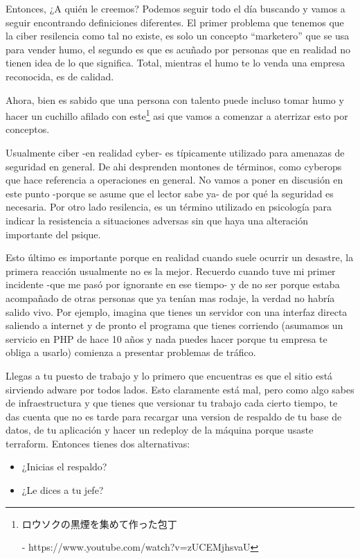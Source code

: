 \documentclass[11pt]{utalcaDoc}
\begin{document}
Entonces, ¿A quién le creemos? Podemos seguir todo el día buscando y vamos a seguir encontrando definiciones diferentes. El primer problema que tenemos que la ciber resilencia como tal no existe, es solo un concepto ``marketero'' que se usa para vender humo, el segundo es que es acuñado por personas que en realidad no tienen idea de lo que significa. Total, mientras el humo te lo venda una empresa reconocida, es de calidad.

Ahora, bien es sabido que una persona con talento puede incluso tomar humo y hacer un cuchillo afilado con este\footnote{\begin{CJK}{UTF8}{min}ロウソクの黒煙を集めて作った包丁 \end{CJK}- https://www.youtube.com/watch?v=zUCEMjhsvaU} asi que vamos a comenzar a aterrizar esto por conceptos.

Usualmente ciber -en realidad cyber- es típicamente utilizado para amenazas de seguridad en general. De ahi desprenden montones de términos, como cyberops que hace referencia a operaciones en general. No vamos a poner en discusión en este punto -porque se asume que el lector sabe ya- de por qué la seguridad es necesaria. Por otro lado resilencia, es un término utilizado en psicología para indicar la resistencia a situaciones adversas sin que haya una alteración importante del psique. 

Esto último es importante porque en realidad cuando suele ocurrir un desastre, la primera reacción usualmente no es la mejor. Recuerdo cuando tuve mi primer incidente -que me pasó por ignorante en ese tiempo- y de no ser porque estaba acompañado de otras personas que ya tenían mas rodaje, la verdad no habría salido vivo. Por ejemplo, imagina que tienes un servidor con una interfaz directa saliendo a internet y de pronto el programa que tienes corriendo (asumamos un servicio en PHP de hace 10 años y nada puedes hacer porque tu empresa te obliga a usarlo) comienza a presentar problemas de tráfico.

Llegas a tu puesto de trabajo y lo primero que encuentras es que el sitio está sirviendo adware por todos lados. Esto claramente está mal, pero como algo sabes de infraestructura y que tienes que versionar tu trabajo cada cierto tiempo, te das cuenta que no es tarde para recargar una version de respaldo de tu base de datos, de tu aplicación y hacer un redeploy de la máquina porque usaste terraform. Entonces tienes dos alternativas:

\begin{itemize}
	\item ¿Inicias el respaldo?
	\item ¿Le dices a tu jefe?
\end{itemize}
\end{document}
